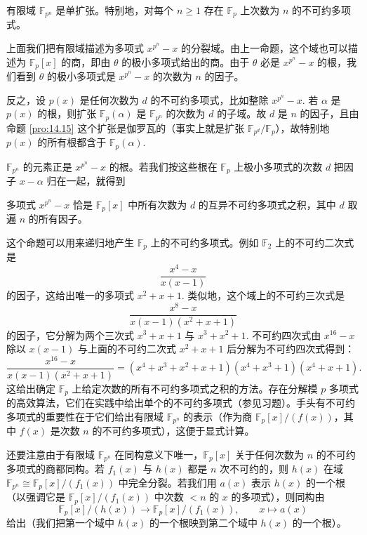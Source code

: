 \begin{proposition}\label{pro:14.17}
有限域 \(\mathbb{F}_{p^n}\) 是单扩张。特别地，对每个 \(n \geq 1\) 存在 \(\mathbb{F}_p\) 上次数为 \(n\) 的不可约多项式。
\end{proposition}

上面我们把有限域描述为多项式 \(x^{p^n}-x\) 的分裂域。由上一命题，这个域也可以描述为 \(\mathbb{F}_p[x]\) 的商，即由 \(\theta\) 的极小多项式给出的商。由于 \(\theta\) 必是 \(x^{p^n}-x\) 的根，我们看到 \(\theta\) 的极小多项式是 \(x^{p^n}-x\) 的次数为 \(n\) 的因子。

反之，设 \(p(x)\) 是任何次数为 \(d\) 的不可约多项式，比如整除 \(x^{p^n}-x\). 若 \(\alpha\) 是 \(p(x)\) 的根，则扩张 \(\mathbb{F}_p(\alpha)\) 是 \(\mathbb{F}_{p^n}\) 的次数为 \(d\) 的子域。故 \(d\) 是 \(n\) 的因子，且由命题 \ref{pro:14.15} 这个扩张是伽罗瓦的（事实上就是扩张 \(\mathbb{F}_{p^d}/\mathbb{F}_p\)），故特别地 \(p(x)\) 的所有根都含于 \(\mathbb{F}_p(\alpha)\).

\(\mathbb{F}_{p^n}\) 的元素正是 \(x^{p^n}-x\) 的根。若我们按这些根在 \(\mathbb{F}_p\) 上极小多项式的次数 \(d\) 把因子 \(x-\alpha\) 归在一起，就得到

\begin{proposition}\label{pro:14.18}
多项式 \(x^{p^n}-x\) 恰是 \(\mathbb{F}_p[x]\) 中所有次数为 \(d\) 的互异不可约多项式之积，其中 \(d\) 取遍 \(n\) 的所有因子。
\end{proposition}

这个命题可以用来递归地产生 \(\mathbb{F}_p\) 上的不可约多项式。例如 \(\mathbb{F}_2\) 上的不可约二次式是
\[
\frac{x^4-x}{x(x-1)}
\]
的因子，这给出唯一的多项式 \(x^2+x+1\). 类似地，这个域上的不可约三次式是
\[
\frac{x^8-x}{x(x-1)(x^2+x+1)}
\]
的因子，它分解为两个三次式 \(x^3+x+1\) 与 \(x^3+x^2+1\). 不可约四次式由 \(x^{16}-x\) 除以 \(x(x-1)\) 与上面的不可约二次式 \(x^2+x+1\) 后分解为不可约四次式得到：
\[
\frac{x^{16}-x}{x(x-1)(x^2+x+1)} = (x^4+x^3+x^2+x+1)(x^4+x^3+1)(x^4+x+1).
\]
这给出确定 \(\mathbb{F}_p\) 上给定次数的所有不可约多项式之积的方法。存在分解模 \(p\) 多项式的高效算法，它们在实践中给出单个的不可约多项式（参见习题）。手头有不可约多项式的重要性在于它们给出有限域 \(\mathbb{F}_{p^n}\) 的表示（作为商 \(\mathbb{F}_p[x]/(f(x))\)，其中 \(f(x)\) 是次数 \(n\) 的不可约多项式），这便于显式计算。

还要注意由于有限域 \(\mathbb{F}_{p^n}\) 在同构意义下唯一，\(\mathbb{F}_p[x]\) 关于任何次数为 \(n\) 的不可约多项式的商都同构。若 \(f_1(x)\) 与 \(h(x)\) 都是 \(n\) 次不可约的，则 \(h(x)\) 在域 \(\mathbb{F}_{p^n} \cong \mathbb{F}_p[x]/(f_1(x))\) 中完全分裂。若我们用 \(a(x)\) 表示 \(h(x)\) 的一个根（以强调它是 \(\mathbb{F}_p[x]/(f_1(x))\) 中次数 \(< n\) 的 \(x\) 的多项式），则同构由
\[
\mathbb{F}_p[x]/(h(x)) \to \mathbb{F}_p[x]/(f_1(x)), \qquad x \mapsto a(x)
\]
给出（我们把第一个域中 \(h(x)\) 的一个根映到第二个域中 \(h(x)\) 的一个根）。

